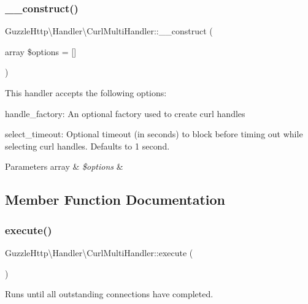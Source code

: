 \subsubsection{\texorpdfstring{\+\_\+\+\_\+construct()}{\_\_construct()}}
{\footnotesize\ttfamily Guzzle\+Http\textbackslash{}\+Handler\textbackslash{}\+Curl\+Multi\+Handler\+::\+\_\+\+\_\+construct (\begin{DoxyParamCaption}\item[{array}]{\$options = {\ttfamily \mbox{[}\mbox{]}} }\end{DoxyParamCaption})}

This handler accepts the following options\+:


\begin{DoxyItemize}
\item handle\+\_\+factory\+: An optional factory used to create curl handles
\item select\+\_\+timeout\+: Optional timeout (in seconds) to block before timing out while selecting curl handles. Defaults to 1 second.
\end{DoxyItemize}


\begin{DoxyParams}[1]{Parameters}
array & {\em \$options} & \\
\hline
\end{DoxyParams}


\subsection{Member Function Documentation}
\mbox{\label{classGuzzleHttp_1_1Handler_1_1CurlMultiHandler_afb724c45e653474792ff7744fc257c7f}} 
\subsubsection{\texorpdfstring{execute()}{execute()}}
{\footnotesize\ttfamily Guzzle\+Http\textbackslash{}\+Handler\textbackslash{}\+Curl\+Multi\+Handler\+::execute (\begin{DoxyParamCaption}{ }\end{DoxyParamCaption})}

Runs until all outstanding connections have completed. \mbox{\label{classGuzzleHttp_1_1Handler_1_1CurlMultiHandler_a0b90b8c277957da0258c1b3cb539b3a7}} 
